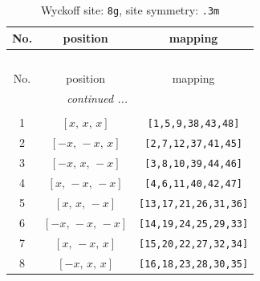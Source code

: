 \documentclass[fleqn,8pt]{jsarticle}
\begin{document}
\renewcommand{\arraystretch}{1.2}
\begin{longtable}{ccc}
\caption{Wyckoff site: {\tt 8g}, site symmetry: {\tt .3m}}
 \\
 \hline \hline
No. & position & mapping \\ \hline \endfirsthead

\multicolumn{2}{l}{\tablename\ \thetable{}} \\
 \hline \hline
No. & position & mapping \\ \hline \endhead

 \hline \hline
\multicolumn{2}{r}{\footnotesize\it continued ...} \\ \endfoot

 \hline \hline
\multicolumn{2}{r}{} \\ \endlastfoot

1 & $\left[ x,\, x,\, x \right]$ & {\tt [1,5,9,38,43,48]} \\ \hline
2 & $\left[ - x,\, - x,\, x \right]$ & {\tt [2,7,12,37,41,45]} \\ \hline
3 & $\left[ - x,\, x,\, - x \right]$ & {\tt [3,8,10,39,44,46]} \\ \hline
4 & $\left[ x,\, - x,\, - x \right]$ & {\tt [4,6,11,40,42,47]} \\ \hline
5 & $\left[ x,\, x,\, - x \right]$ & {\tt [13,17,21,26,31,36]} \\ \hline
6 & $\left[ - x,\, - x,\, - x \right]$ & {\tt [14,19,24,25,29,33]} \\ \hline
7 & $\left[ x,\, - x,\, x \right]$ & {\tt [15,20,22,27,32,34]} \\ \hline
8 & $\left[ - x,\, x,\, x \right]$ & {\tt [16,18,23,28,30,35]} \\
\end{longtable}
\renewcommand{\arraystretch}{1.2}
\end{document}
